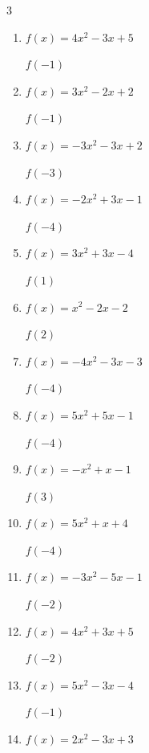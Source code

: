 \begin{multicols}{3}
\begin{enumerate}
$f(-2)$
        \phantom{$= 7$}

  \item $f(x)=4x^{2}-3x+5$

$f(-1)$
        \phantom{$= 12$}

  \item $f(x)=3x^{2}-2x+2$

$f(-1)$
        \phantom{$= 7$}

  \item $f(x)=-3x^{2}-3x+2$

$f(-3)$
        \phantom{$= -16$}

  \item $f(x)=-2x^{2}+3x-1$

$f(-4)$
        \phantom{$= -45$}

  \item $f(x)=3x^{2}+3x-4$

$f(1)$
        \phantom{$= 2$}

  \item $f(x)=x^{2}-2x-2$

$f(2)$
        \phantom{$= -2$}

  \item $f(x)=-4x^{2}-3x-3$

$f(-4)$
        \phantom{$= -55$}

  \item $f(x)=5x^{2}+5x-1$

$f(-4)$
        \phantom{$= 59$}

  \item $f(x)=-x^{2}+x-1$

$f(3)$
        \phantom{$= -7$}

  \item $f(x)=5x^{2}+x+4$

$f(-4)$
        \phantom{$= 80$}

  \item $f(x)=-3x^{2}-5x-1$

$f(-2)$
        \phantom{$= -3$}

\columnbreak %

  \item $f(x)=4x^{2}+3x+5$

$f(-2)$
        \phantom{$= 15$}

  \item $f(x)=5x^{2}-3x-4$

$f(-1)$
        \phantom{$= 4$}

  \item $f(x)=2x^{2}-3x+3$


\end{enumerate}
\end{multicols}
